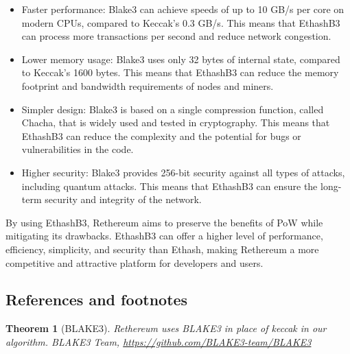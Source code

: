 \documentclass[a4paper,onecolumn, superscriptaddress,10pt,accepted=2020-05-01,issue=1, volume=2, shorttitle=papers]{compositionalityarticle}
\newtheorem{theorem}{Theorem}
\begin{document}
\begin{itemize}
    \item Faster performance: Blake3 can achieve speeds of up to 10 GB/s per core on modern CPUs, compared to Keccak's 0.3 GB/s. This means that EthashB3 can process more transactions per second and reduce network congestion.
\end{itemize}
\begin{itemize}
    \item Lower memory usage: Blake3 uses only 32 bytes of internal state, compared to Keccak's 1600 bytes. This means that EthashB3 can reduce the memory footprint and bandwidth requirements of nodes and miners.
\end{itemize}
\begin{itemize}
    \item Simpler design: Blake3 is based on a single compression function, called Chacha, that is widely used and tested in cryptography. This means that EthashB3 can reduce the complexity and the potential for bugs or vulnerabilities in the code.
\end{itemize}
\begin{itemize}
    \item Higher security: Blake3 provides 256-bit security against all types of attacks, including quantum attacks. This means that EthashB3 can ensure the long-term security and integrity of the network.
\end{itemize}

\vspace{0.3cm}

By using EthashB3, Rethereum aims to preserve the benefits of PoW while mitigating its drawbacks. EthashB3 can offer a higher level of performance, efficiency, simplicity, and security than Ethash, making Rethereum a more competitive and attractive platform for developers and users.

\subsection{References and footnotes}
\label{sec:subsec1}

\begin{theorem}[BLAKE3]
  Rethereum uses BLAKE3 in place of keccak in our algorithm.
   BLAKE3 Team,
  \href{https://github.com/BLAKE3-team/BLAKE3}
       {https://github.com/BLAKE3-team/BLAKE3}
\end{theorem}

\vspace{1cm}
\end{document}

